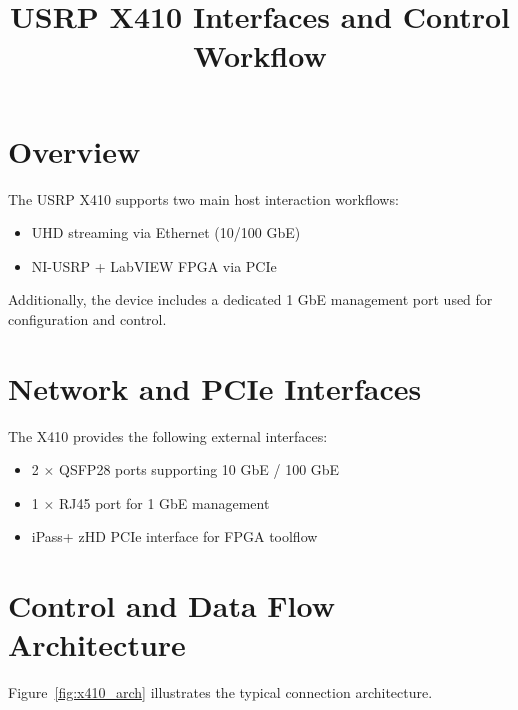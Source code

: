 \documentclass[12pt]{article}
\title{USRP X410 Interfaces and Control Workflow}
\date{}
\begin{document}
\maketitle

\section{Overview}

The USRP X410 supports two main host interaction workflows:

\begin{itemize}
\item UHD streaming via Ethernet (10/100 GbE)
\item NI-USRP + LabVIEW FPGA via PCIe
\end{itemize}

Additionally, the device includes a dedicated 1 GbE management port used
for configuration and control.

\section{Network and PCIe Interfaces}

The X410 provides the following external interfaces:

\begin{itemize}
\item 2 $\times$ QSFP28 ports supporting 10 GbE / 100 GbE
\item 1 $\times$ RJ45 port for 1 GbE management
\item iPass+ zHD PCIe interface for FPGA toolflow
\end{itemize}

\section{Control and Data Flow Architecture}

Figure~\ref{fig:x410_arch} illustrates the typical connection architecture.
\end{document}
